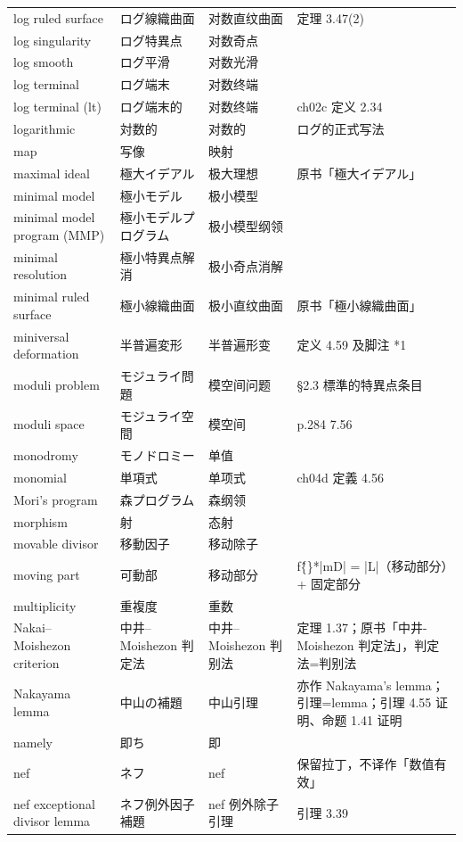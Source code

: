 \begin{longtable}{@{}>{\raggedright\arraybackslash}p{}>{\raggedright\arraybackslash}p{}>{\raggedright\arraybackslash}p{}>{\raggedright\arraybackslash}p{}@{}}
log ruled surface & ログ線織曲面 & 对数直纹曲面 & 定理 3.47(2) \\
log singularity & ログ特異点 & 对数奇点 &  \\
log smooth & ログ平滑 & 对数光滑 &  \\
log terminal & ログ端末 & 对数终端 &  \\
log terminal (lt) & ログ端末的 & 对数终端 & ch02c 定义 2.34 \\
logarithmic & 対数的 & 对数的 & ログ的正式写法 \\
map & 写像 & 映射 &  \\
maximal ideal & 極大イデアル & 极大理想 & 原书「極大イデアル」 \\
minimal model & 極小モデル & 极小模型 &  \\
minimal model program (MMP) & 極小モデルプログラム & 极小模型纲领 &  \\
minimal resolution & 極小特異点解消 & 极小奇点消解 &  \\
minimal ruled surface & 極小線織曲面 & 极小直纹曲面 & 原书「極小線織曲面」 \\
miniversal deformation & 半普遍変形 & 半普遍形变 & 定义 4.59 及脚注 *1 \\
moduli problem & モジュライ問題 & 模空间问题 & §2.3 標準的特異点条目 \\
moduli space & モジュライ空間 & 模空间 & p.284 7.56 \\
monodromy & モノドロミー & 单值 &  \\
monomial & 単項式 & 单项式 & ch04d 定義 4.56 \\
Mori's program & 森プログラム & 森纲领 &  \\
morphism & 射 & 态射 &  \\
movable divisor & 移動因子 & 移动除子 &  \\
moving part & 可動部 & 移动部分 & f\^\{\}*|mD| = |L|（移动部分）+ 固定部分 \\
multiplicity & 重複度 & 重数 &  \\
Nakai--Moishezon criterion & 中井--Moishezon 判定法 & 中井–Moishezon 判别法 & 定理 1.37；原书「中井-Moishezon 判定法」，判定法=判别法 \\
Nakayama lemma & 中山の補題 & 中山引理 & 亦作 Nakayama's lemma；引理=lemma；引理 4.55 证明、命题 1.41 证明 \\
namely & 即ち & 即 &  \\
nef & ネフ & nef & 保留拉丁，不译作「数值有效」 \\
nef exceptional divisor lemma & ネフ例外因子補題 & nef 例外除子引理 & 引理 3.39 \\

\end{longtable}
